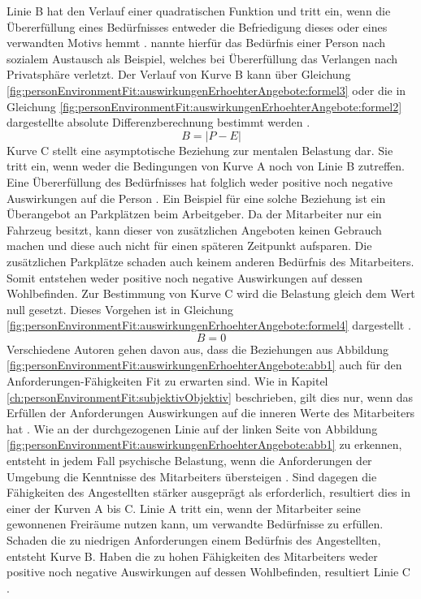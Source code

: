 Linie B hat den Verlauf einer quadratischen Funktion und tritt ein, wenn die Übererfüllung eines Bedürfnisses entweder die Befriedigung dieses oder eines verwandten Motivs hemmt \cite[S. 5]{caplan:1987}. \textcite[S. 12]{harrison:1978} nannte hierfür das Bedürfnis einer Person nach sozialem Austausch als Beispiel, welches bei Übererfüllung das Verlangen nach Privatsphäre verletzt. Der Verlauf von Kurve B kann über Gleichung \ref{fig:personEnvironmentFit:auswirkungenErhoehterAngebote:formel3} oder die in Gleichung \ref{fig:personEnvironmentFit:auswirkungenErhoehterAngebote:formel2} dargestellte absolute Differenzberechnung bestimmt werden \cite[S. 2]{edwards:1993}.
\begin{equation}
	B = |P - E|
	\label{fig:personEnvironmentFit:auswirkungenErhoehterAngebote:formel2}
\end{equation}
Kurve C stellt eine asymptotische Beziehung zur mentalen Belastung dar. Sie tritt ein, wenn weder die Bedingungen von Kurve A noch von Linie B zutreffen. Eine Übererfüllung des Bedürfnisses hat folglich weder positive noch negative Auswirkungen auf die Person \cite[S. 30]{mechanismsOfJobStressAndStrain:1982}. Ein Beispiel für eine solche Beziehung ist ein Überangebot an Parkplätzen beim Arbeitgeber. Da der Mitarbeiter nur ein Fahrzeug besitzt, kann dieser von zusätzlichen Angeboten keinen Gebrauch machen und diese auch nicht für einen späteren Zeitpunkt aufsparen. Die zusätzlichen Parkplätze schaden auch keinem anderen Bedürfnis des Mitarbeiters. Somit entstehen weder positive noch negative Auswirkungen auf dessen Wohlbefinden. Zur Bestimmung von Kurve C wird die Belastung gleich dem Wert null gesetzt. Dieses Vorgehen ist in Gleichung \ref{fig:personEnvironmentFit:auswirkungenErhoehterAngebote:formel4} dargestellt \cite[S. 2]{edwards:1993}.
\begin{equation}
	B = 0
	\label{fig:personEnvironmentFit:auswirkungenErhoehterAngebote:formel4}
\end{equation}
Verschiedene Autoren gehen davon aus, dass die Beziehungen aus Abbildung \ref{fig:personEnvironmentFit:auswirkungenErhoehterAngebote:abb1} auch für den Anforderungen-Fähigkeiten Fit zu erwarten sind. Wie in Kapitel \ref{ch:personEnvironmentFit:subjektivObjektiv} beschrieben, gilt dies nur, wenn das Erfüllen der Anforderungen Auswirkungen auf die inneren Werte des Mitarbeiters hat \cite[S. 12f.]{harrison:1978}. Wie an der durchgezogenen Linie auf der linken Seite von Abbildung \ref{fig:personEnvironmentFit:auswirkungenErhoehterAngebote:abb1} zu erkennen, entsteht in jedem Fall psychische Belastung, wenn die Anforderungen der Umgebung die Kenntnisse des Mitarbeiters übersteigen \cite[S. 5]{schuler:1980}. Sind dagegen die Fähigkeiten des Angestellten stärker ausgeprägt als erforderlich, resultiert dies in einer der Kurven A bis C. Linie A tritt ein, wenn der Mitarbeiter seine gewonnenen Freiräume nutzen kann, um verwandte Bedürfnisse zu erfüllen. Schaden die zu niedrigen Anforderungen einem Bedürfnis des Angestellten, entsteht Kurve B. Haben die zu hohen Fähigkeiten des Mitarbeiters weder positive noch negative Auswirkungen auf dessen Wohlbefinden, resultiert Linie C \cite[S. 22f.]{edwards:2008}.

